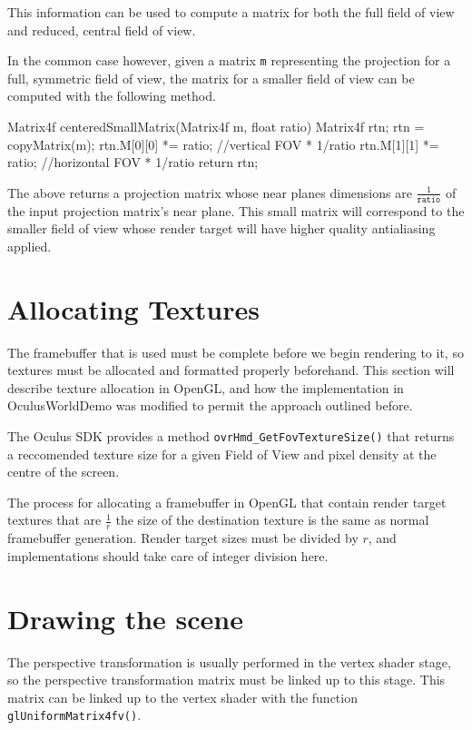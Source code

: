 \documentclass[12pt,a4paper,twoside,openright]{report}
\begin{document}
This information can be used to compute a matrix for both the full field of view and reduced, central field of view.

In the common case however, given a matrix \texttt{m} representing the projection for a full, symmetric field of view, the matrix for a smaller field of view can be computed with the following method.

\begin{blockcode}
Matrix4f centeredSmallMatrix(Matrix4f m, float ratio){
    Matrix4f rtn; 
    rtn = copyMatrix(m);
    rtn.M[0][0] *= ratio; //vertical FOV * 1/ratio
    rtn.M[1][1] *= ratio; //horizontal FOV * 1/ratio
    return rtn;
}
\end{blockcode}

The above returns a projection matrix whose near planes dimensions are $\frac{1}{\texttt{ratio}}$ of the input projection matrix's near plane. This small matrix will correspond to the smaller field of view whose render target will have higher quality antialiasing applied. 

\section{Allocating Textures}

The framebuffer that is used must be complete before we begin rendering to it, so textures must be allocated and formatted properly beforehand. This section will describe texture allocation in OpenGL, and how the implementation in OculusWorldDemo was modified to permit the approach outlined before. 
 
The Oculus SDK provides a method \texttt{ovrHmd\_GetFovTextureSize()} that returns a reccomended texture size for a given Field of View and pixel density at the centre of the screen.

The process for allocating a framebuffer in OpenGL that contain render target textures that are $\frac{1}{r}$ the size of the destination texture is the same as normal framebuffer generation. Render target sizes must be divided by $r$, and implementations should take care of integer division here.

\section{Drawing the scene}

The perspective transformation is usually performed in the vertex shader stage, so the perspective transformation matrix must be linked up to this stage.
This matrix can be linked up to the vertex shader with the function \texttt{glUniformMatrix4fv()}.\\
\end{document}
